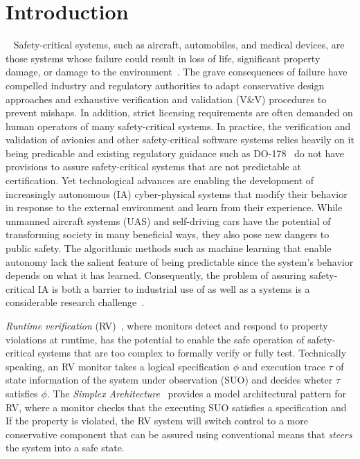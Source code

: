 \section{Introduction}~\label{sec:intro} 
Safety-critical systems, such as aircraft, automobiles, and medical
devices, are those systems whose failure could result
in loss of life, significant property damage, or damage to the
environment~\cite{Knight2002}.  The  grave consequences of failure have compelled
industry and regulatory authorities  to adapt conservative design
approaches and exhaustive verification and validation (V\&V) procedures
to prevent mishaps. In addition, strict licensing requirements are
often demanded on human operators of  many safety-critical systems.
In practice, the verification and validation of avionics
and other safety-critical software systems relies heavily on it being
predicable and existing regulatory guidance  such as
DO-178~\cite{DO178B}  do not  have provisions to
assure safety-critical systems that are not predictable at certification. 
Yet technological advances are enabling the development of increasingly
autonomous (IA) cyber-physical  systems that modify their behavior in response
to the external environment and learn from their experience.  While
unmanned aircraft systems (UAS) and self-driving cars have the
potential of transforming society in many beneficial ways, they also
pose new dangers to public safety. The algorithmic methods such as
machine learning that enable autonomy lack the salient feature of
being predictable since the system's behavior depends on what it has
learned.  Consequently, the  problem  of assuring safety-critical IA is
both a barrier to industrial use of  as well as a 
systems is a considerable research challenge~\cite{NRC14}.


\emph{Runtime verification} (RV)~\cite{monitors}, where monitors
detect and respond to property violations at runtime, has the
potential to enable the safe operation of safety-critical systems that
are too complex to formally verify or fully test.  Technically
speaking, an RV monitor takes a logical specification $\phi$ and
execution trace $\tau$ of state information of the system under
observation (SUO) and decides wheter $\tau$ satisfies $\phi$. The
\emph{Simplex Architecture}~\cite{simplex} provides a model
architectural pattern for RV, where a monitor checks that the
executing SUO satisfies a specification and If the property is
violated, the RV system will switch control to a more conservative
component that can be assured using conventional means that
\emph{steers} the system into a safe state.

